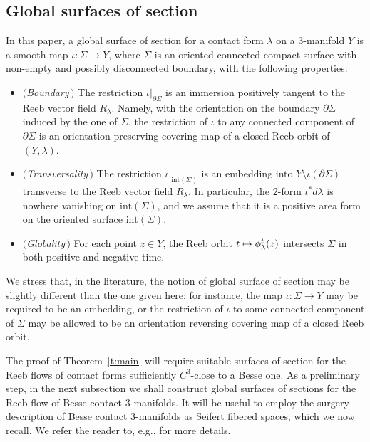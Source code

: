 \documentclass[JEP,XML,SOM,Unicode,published]{cedram}
\newcommand\mto{\mathchoice{\longmapsto}{\mapsto}{\mapsto}{\mapsto}}
\theoremstyle{definition}
\let\diff d
\begin{document}
\subsection{Global surfaces of section}
\label{s:sos_def}
In this paper, a global surface of section for a contact form $\lambda$ on a $3$-manifold $Y$ is a smooth map $\iota:\Sigma\to Y$, where $\Sigma$ is an oriented connected compact surface with non-empty and possibly disconnected boundary, with the following properties:
\begin{itemize}

\item \textit{$($Boundary$\,)$} The restriction $\iota|_{\partial\Sigma}$ is an immersion positively tangent to the Reeb vector field $R_{\lambda}$. Namely, with the orientation on the boundary $\partial\Sigma$ induced by the one of $\Sigma$,
the restriction of $\iota$ to any connected component of $\partial\Sigma$ is an orientation preserving covering map of a closed Reeb orbit of $(Y,\lambda)$.\vspace{2pt}

\item \textit{$($Transversality$\,)$} The restriction $\iota|_{\mathrm{int}(\Sigma)}$ is an embedding into $Y\setminus\iota(\partial\Sigma)$ transverse to the Reeb vector field $R_\lambda$.
In particular, the $2$-form $\iota^*\diff\lambda$ is nowhere vanishing on $\mathrm{int}(\Sigma)$, and we assume that it is a positive area form on the oriented surface $\mathrm{int}(\Sigma)$.\vspace{2pt}

\item \textit{$($Globality$\,)$} For each point $z\in Y$, the Reeb orbit $t\mto\phi_\lambda^t(z)$ intersects $\Sigma$ in both positive and negative time.

\end{itemize}
We stress that, in the literature, the notion of global surface of section may be slightly different than the one given here: for instance, the map $\iota:\Sigma\to Y$ may be required to be an embedding, or the restriction of $\iota$ to some connected component of $\Sigma$ may be allowed to be an orientation reversing covering map of a closed Reeb orbit.

\label{s:surgery}

The proof of Theorem~\ref{t:main} will require suitable surfaces of section for the Reeb flows of contact forms sufficiently $C^3$-close to a Besse one. As a preliminary step, in the next subsection we shall construct global surfaces of sections for the Reeb flow of Besse contact $3$-manifolds. It will be useful to employ the surgery description of Besse contact $3$-manifolds as Seifert fibered spaces, which we now recall. We refer the reader to, e.g., \cite{Orlik:1972ts,Jankins:1983zm} for more details.
\end{document}
